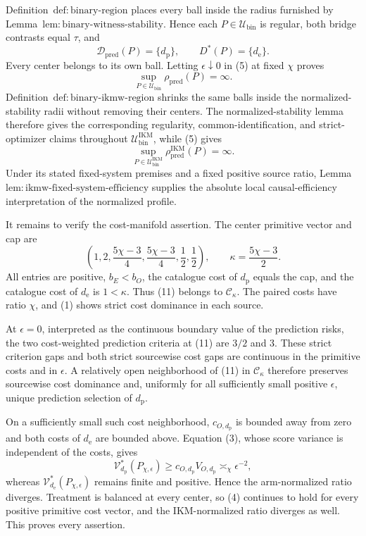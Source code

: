 Definition~\(\mathrm{def{:}binary\text{-}region}\) places every ball inside the radius furnished by Lemma~\(\mathrm{lem{:}binary\text{-}witness\text{-}stability}\). Hence each \(P\in\mathcal U_{\mathrm{bin}}\) is regular, both bridge contrasts equal \(\tau\), and
\[
 \mathcal D_{\mathrm{pred}}(P)=\{d_{\mathrm p}\},
 \qquad
 D^*(P)=\{d_{\mathrm e}\}.                            \tag{8}
\]
Every center belongs to its own ball. Letting \(\epsilon\downarrow0\) in (5) at fixed \(\chi\) proves
\[
 \sup_{P\in\mathcal U_{\mathrm{bin}}}\rho_{\mathrm{pred}}(P)=\infty. \tag{9}
\]
Definition~\(\mathrm{def{:}binary\text{-}ikmw\text{-}region}\) shrinks the same balls inside the normalized-stability radii without removing their centers. The normalized-stability lemma therefore gives the corresponding regularity, common-identification, and strict-optimizer claims throughout \(\mathcal U_{\mathrm{bin}}^{\mathrm{IKM}}\), while (5) gives
\[
 \sup_{P\in\mathcal U_{\mathrm{bin}}^{\mathrm{IKM}}}
 \rho_{\mathrm{pred}}^{\mathrm{IKM}}(P)=\infty.       \tag{10}
\]
Under its stated fixed-system premises and a fixed positive source ratio, Lemma~\(\mathrm{lem{:}ikmw\text{-}fixed\text{-}system\text{-}efficiency}\) supplies the absolute local causal-efficiency interpretation of the normalized profile.

It remains to verify the cost-manifold assertion. The center primitive vector and cap are
\[
 \left(1,2,\frac{5\chi-3}{4},\frac{5\chi-3}{4},
 \frac12,\frac12\right),
 \qquad \kappa=\frac{5\chi-3}{2}.                     \tag{11}
\]
All entries are positive, \(b_E<b_O\), the catalogue cost of \(d_{\mathrm p}\) equals the cap, and the catalogue cost of \(d_{\mathrm e}\) is \(1<\kappa\). Thus (11) belongs to \(\mathcal C_\kappa\). The paired costs have ratio \(\chi\), and (1) shows strict cost dominance in each source.

At \(\epsilon=0\), interpreted as the continuous boundary value of the prediction risks, the two cost-weighted prediction criteria at (11) are \(3/2\) and \(3\). These strict criterion gaps and both strict sourcewise cost gaps are continuous in the primitive costs and in \(\epsilon\). A relatively open neighborhood of (11) in \(\mathcal C_\kappa\) therefore preserves sourcewise cost dominance and, uniformly for all sufficiently small positive \(\epsilon\), unique prediction selection of \(d_{\mathrm p}\).

On a sufficiently small such cost neighborhood, \(c_{O,d_{\mathrm p}}\) is bounded away from zero and both costs of \(d_{\mathrm e}\) are bounded above. Equation (3), whose score variance is independent of the costs, gives
\[
 \mathcal V_{d_{\mathrm p}}^*(P_{\chi,\epsilon})
 \ge c_{O,d_{\mathrm p}}V_{O,d_{\mathrm p}}
 \asymp_\chi\epsilon^{-2},                            \tag{12}
\]
whereas \(\mathcal V_{d_{\mathrm e}}^*(P_{\chi,\epsilon})\) remains finite and positive. Hence the arm-normalized ratio diverges. Treatment is balanced at every center, so (4) continues to hold for every positive primitive cost vector, and the IKM-normalized ratio diverges as well. This proves every assertion.